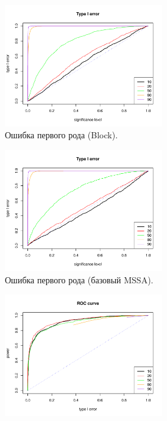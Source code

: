 \documentclass[specialist,
substylefile = spbu_report.rtx,
subf,href,colorlinks=true, 12pt]{disser}
\theoremstyle{definition}
\begin{document}
		\begin{figure}
		\captionsetup[subfigure]{justification=Centering}
		\begin{subfigure}[t]{0.45\textwidth}
			\centering
			\includegraphics[width=0.75\textwidth]{type1error_block_ev.pdf}
			\caption{Ошибка первого рода (Block).}
			\label{fig:block_ev_a}
		\end{subfigure}\hspace{\fill}
		\begin{subfigure}[t]{0.45\textwidth}
			\centering
			\includegraphics[width=0.75\textwidth]{type1error_mssa_ev.pdf}
			\caption{Ошибка первого рода (базовый MSSA).}
		\end{subfigure}
		\bigskip
		\begin{subfigure}[t]{0.45\textwidth}
			\centering
			\includegraphics[width=0.75\textwidth]{roc_block_ev.pdf}

\end{subfigure}
\end{figure}
\end{document}
